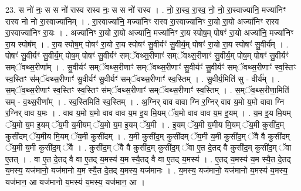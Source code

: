 \documentclass[17pt]{extarticle}
\begin{document}
23. स नो॑ नः॒ स स नो॑ रास्व रास्व नः॒ स स नो॑ रास्व । . नो॒ रा॒स्व॒ रा॒स्व॒ नो॒ नो॒ रा॒स्वाज्या॑नि॒ मज्या॑निꣳ रास्व नो नो रा॒स्वाज्या॑निम् । . रा॒स्वाज्या॑नि॒ मज्या॑निꣳ रास्व रा॒स्वाज्या॑निꣳ रा॒यो रा॒यो अज्या॑निꣳ रास्व रा॒स्वाज्या॑निꣳ रा॒यः । . अज्या॑निꣳ रा॒यो रा॒यो अज्या॑नि॒ मज्या॑निꣳ रा॒य स्पोष॒म् पोषꣳ॑ रा॒यो अज्या॑नि॒ मज्या॑निꣳ रा॒य स्पोष᳚म् । . रा॒य स्पोष॒म् पोषꣳ॑ रा॒यो रा॒य स्पोषꣳ॑ सु॒वीर्यꣳ॑ सु॒वीर्य॒म् पोषꣳ॑ रा॒यो रा॒य स्पोषꣳ॑ सु॒वीर्य᳚म् । . पोषꣳ॑ सु॒वीर्यꣳ॑ सु॒वीर्य॒म् पोष॒म् पोषꣳ॑ सु॒वीर्यꣳ॑ सम्ॅवथ्स॒रीणाꣳ॑ सम्ॅवथ्स॒रीणाꣳ॑ सु॒वीर्य॒म् पोष॒म् पोषꣳ॑ सु॒वीर्यꣳ॑ सम्ॅवथ्स॒रीणा᳚म् । . सु॒वीर्यꣳ॑ सम्ॅवथ्स॒रीणाꣳ॑ सम्ॅवथ्स॒रीणाꣳ॑ सु॒वीर्यꣳ॑ सु॒वीर्यꣳ॑ सम्ॅवथ्स॒रीणाꣳ॑ स्व॒स्तिꣳ स्व॒स्तिꣳ स॑म्ॅवथ्स॒रीणाꣳ॑ सु॒वीर्यꣳ॑ सु॒वीर्यꣳ॑ सम्ॅवथ्स॒रीणाꣳ॑ स्व॒स्तिम् । . सु॒वीर्य॒मिति॑ सु - वीर्य᳚म् । . स॒म्ॅव॒थ्स॒रीणाꣳ॑ स्व॒स्तिꣳ स्व॒स्तिꣳ स॑म्ॅवथ्स॒रीणाꣳ॑ सम्ॅवथ्स॒रीणाꣳ॑ स्व॒स्तिम् । . स॒म्ॅव॒थ्स॒रीणा॒मिति॑ सम् - व॒थ्स॒रीणा᳚म् । . स्व॒स्तिमिति॑ स्व॒स्तिम् । . अ॒ग्निर् वाव वावा ग्नि र॒ग्निर् वाव य॒मो य॒मो वावा ग्नि र॒ग्निर् वाव य॒मः । . वाव य॒मो य॒मो वाव वाव य॒म इ॒य मि॒यम् ॅय॒मो वाव वाव य॒म इ॒यम् । . य॒म इ॒य मि॒यम् ॅय॒मो य॒म इ॒यम् ॅय॒मी य॒मीयम् ॅय॒मो य॒म इ॒यम् ॅय॒मी । . इ॒यम् ॅय॒मी य॒मीय मि॒यम् ॅय॒मी कुसी॑द॒म् कुसी॑दम् ॅय॒मीय मि॒यम् ॅय॒मी कुसी॑दम् । . य॒मी कुसी॑द॒म् कुसी॑दम् ॅय॒मी य॒मी कुसी॑द॒म् ॅवै वै कुसी॑दम् ॅय॒मी य॒मी कुसी॑द॒म् ॅवै । . कुसी॑द॒म् ॅवै वै कुसी॑द॒म् कुसी॑द॒म् ॅवा ए॒त दे॒तद् वै कुसी॑द॒म् कुसी॑द॒म् ॅवा ए॒तत् । . वा ए॒त दे॒तद् वै वा ए॒तद् य॒मस्य॑ य॒म स्यै॒तद् वै वा ए॒तद् य॒मस्य॑ । . ए॒तद् य॒मस्य॑ य॒म स्यै॒त दे॒तद् य॒मस्य॒ यज॑मानो॒ यज॑मानो य॒म स्यै॒त दे॒तद् य॒मस्य॒ यज॑मानः । . य॒मस्य॒ यज॑मानो॒ यज॑मानो य॒मस्य॑ य॒मस्य॒ यज॑मान॒ आ यज॑मानो य॒मस्य॑ य॒मस्य॒ यज॑मान॒ आ । \newline
\end{document}
